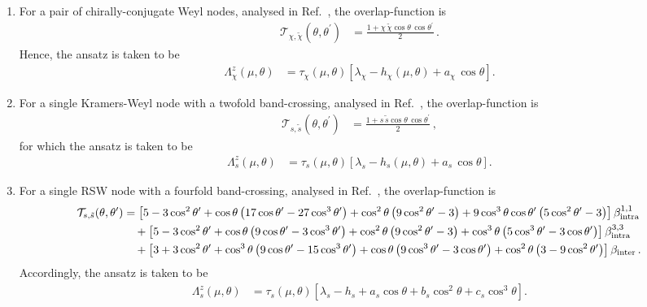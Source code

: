\documentclass[aps,prb,onecolumn,nofootinbib,citeautoscript,10pt]{revtex4-2}
\def \nn{\nonumber \\}
\begin{document}
\begin{enumerate}
\item For a pair of chirally-conjugate Weyl nodes, analysed in Ref.~\cite{timm}, the overlap-function is
\begin{align}
{\mathcal T }_{ \chi, \tilde \chi} (\theta, \theta^\prime)
& = \frac{ 1 + \chi \, \tilde \chi \cos \theta \, \cos \theta^\prime }{2} \, .
\end{align}
Hence, the ansatz is taken to be
\begin{align}
 {\Lambda}^z_\chi (\mu,\theta ) & = 
\tau_\chi (\mu,\theta) \left [ \lambda_\chi - h_\chi (\mu, \theta) 
 + a_\chi \, \cos \theta  \right ].
\end{align}

\item For a single Kramers-Weyl node with a twofold band-crossing, analysed in Ref.~\cite{ips-exact-kwn}, the overlap-function is
\begin{align}
{\mathcal T }_{ s, \tilde s} (\theta, \theta^\prime)
& = \frac{ 1 + s \, \tilde s \cos \theta \, \cos \theta^\prime }{2} \, ,
\end{align}
for which the ansatz is taken to be
\begin{align}
 {\Lambda}^z_s (\mu,\theta ) & = 
\tau_s (\mu,\theta) \left [ \lambda_s - h_{s} (\mu, \theta) 
 + a_s \, \cos \theta  \right ].
\end{align}

\item For a single RSW node with a fourfold band-crossing, analysed in Ref.~\cite{ips-exact-rsw}, the overlap-function is
\begin{align}
{\mathcal T }_{ s, \tilde s} (\theta, \theta^\prime)
& = \left[  5 -3 \cos^2 \theta^\prime 
+ \cos  \theta  \left(17 \cos  \theta^\prime  -
27 \cos^3 \theta^\prime  \right)+\cos^2 \theta  
\left(9 \cos^2 \theta^\prime  -3\right) 
  +9 \cos^3 \theta  \cos  \theta^\prime   \left(5 \cos^2 \theta^\prime  -3\right)
    \right ] \beta_{\rm intra}^{1,1} \nn & \quad
+ \left[ 5 - 3\cos^2 \theta^\prime
+\cos  \theta  \left(9 \cos\theta^\prime  -3 \cos^3 \theta^\prime  \right)
+ \cos^2 \theta  \left(9 \cos^2 \theta^\prime  -3\right)
+ \cos^3 \theta  \left(5 \cos^3 \theta^\prime  -3 \cos  \theta^\prime  \right)  
\right ] \beta_{\rm intra}^{3,3} \nn & \quad
+ \left[ 3 + 3\cos^2 \theta^\prime  
+ \cos^3 \theta  \left(9 \cos  \theta^\prime  -15 \cos^3 \theta^\prime  \right)
+\cos  \theta  \left(9 \cos^3 \theta^\prime  -3 \cos  \theta^\prime  \right)
   +\cos^2 \theta  \left(3-9 \cos^2 \theta^\prime  \right)  
 \right ]  \beta_{\rm inter}\,.
\end{align}
Accordingly, the ansatz is taken to be
\begin{align}
 {\Lambda}^z_s (\mu,\theta ) & = 
\tau_s (\mu,\theta)
 \left [ \lambda_s - h_s + a_s \cos \theta  + b_s \cos ^2 \theta 
 + c_s \cos^3 \theta   \right ].
\end{align}
\end{enumerate}



 


\end{document}
